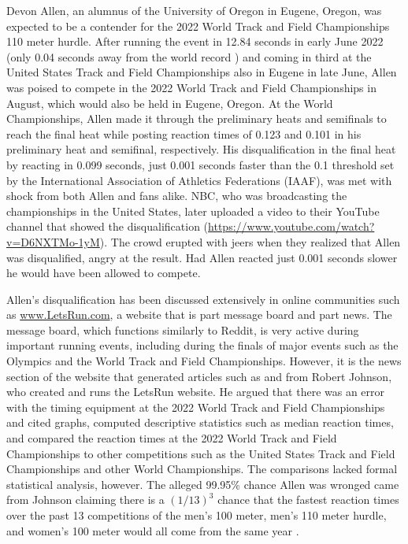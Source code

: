 \documentclass[12pt, letterpaper, titlepage]{article}
\begin{document}
Devon Allen, an alumnus of the University of Oregon in Eugene, Oregon, was
expected to be a contender for the 2022 World Track and Field Championships 110 
meter hurdle. After running the event in 12.84 seconds in early June 2022 
(only 0.04 seconds away from the world record \citep{wa2022preview}) and coming 
in third at the United States Track and Field Championships also in Eugene 
in late June, Allen was poised to compete in the 2022 World Track and 
Field Championships in August, which would also be held in Eugene, Oregon.
At the World Championships, Allen made it through the preliminary
heats and semifinals to reach the final heat while posting reaction times of 
0.123 and 0.101 in his preliminary heat and semifinal, respectively. 
His disqualification in the final heat by reacting in 0.099 seconds, just 0.001
seconds faster than the 0.1 threshold set by the International Association of
Athletics Federations (IAAF), was met
with shock from both Allen and fans alike. NBC, who was broadcasting the
championships in the United States, later uploaded a video to their YouTube
channel that showed the disqualification
(\url{https://www.youtube.com/watch?v=D6NXTMo-1yM}).
The crowd erupted with jeers
when they realized that Allen was disqualified, angry at the result. Had Allen 
reacted just 0.001 seconds slower he would have been allowed to compete.


Allen's disqualification has been discussed extensively in online communities
such as \url{www.LetsRun.com}, a website that is part message board and part
news. The message board,
which functions similarly to Reddit, is very active during important running
events, including during the finals of major events such as
the Olympics and the World Track and Field Championships. However, it is the
news section of the website that generated articles such as \citet{johnson2022data}
and \citet{johnson2022was} from  Robert Johnson, who created and runs 
the LetsRun website. He argued that there was an error
with the timing equipment at the 2022 World Track and Field Championships and
cited graphs, computed descriptive statistics such as median reaction times, and 
compared the reaction times at the 2022 World Track and Field Championships to 
other competitions
such as the United States Track and Field Championships and other World Championships.
The comparisons lacked formal statistical analysis, however. 
The alleged 99.95\% chance Allen was wronged 
came from Johnson claiming there is a $(1/13)^3$ chance that the fastest 
reaction times over the past 13 competitions of the men's 100 meter, men's 110 
meter hurdle, and women's 100 meter would all come from the same year 
\citep{johnson2022was}.
\end{document}
